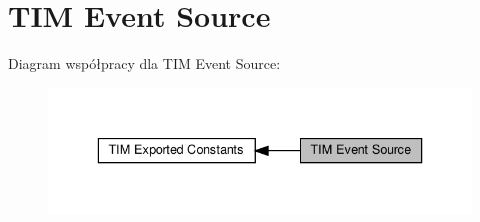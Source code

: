 \hypertarget{group___t_i_m___event___source}{}\section{T\+IM Event Source}
\label{group___t_i_m___event___source}
Diagram współpracy dla T\+IM Event Source\+:\nopagebreak
\begin{figure}[H]
\begin{center}
\leavevmode
\includegraphics[width=336pt]{group___t_i_m___event___source}
\end{center}
\end{figure}
